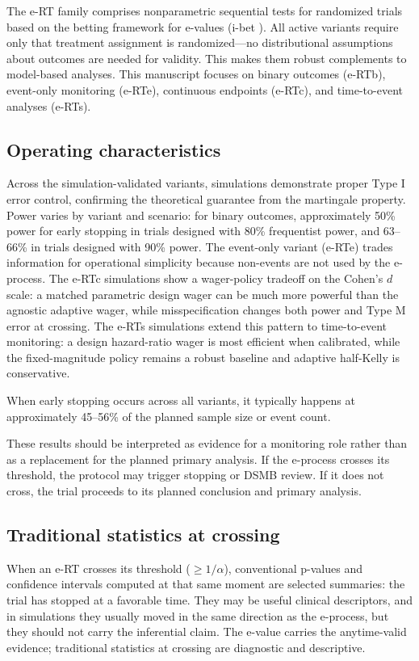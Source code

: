 \documentclass[10pt]{article}
\begin{document}
The e-RT family comprises nonparametric sequential tests for randomized trials based on the betting framework for e-values (i-bet \cite{pmlr-v177-duan22a}). All active variants require only that treatment assignment is randomized---no distributional assumptions about outcomes are needed for validity. This makes them robust complements to model-based analyses. This manuscript focuses on binary outcomes (e-RTb), event-only monitoring (e-RTe), continuous endpoints (e-RTc), and time-to-event analyses (e-RTs).

\subsection{Operating characteristics}

Across the simulation-validated variants, simulations demonstrate proper Type I error control, confirming the theoretical guarantee from the martingale property. Power varies by variant and scenario: for binary outcomes, approximately 50\% power for early stopping in trials designed with 80\% frequentist power, and 63--66\% in trials designed with 90\% power. The event-only variant (e-RTe) trades information for operational simplicity because non-events are not used by the e-process. The e-RTc simulations show a wager-policy tradeoff on the Cohen's $d$ scale: a matched parametric design wager can be much more powerful than the agnostic adaptive wager, while misspecification changes both power and Type M error at crossing. The e-RTs simulations extend this pattern to time-to-event monitoring: a design hazard-ratio wager is most efficient when calibrated, while the fixed-magnitude policy remains a robust baseline and adaptive half-Kelly is conservative.

When early stopping occurs across all variants, it typically happens at approximately 45--56\% of the planned sample size or event count.

These results should be interpreted as evidence for a monitoring role rather than as a replacement for the planned primary analysis. If the e-process crosses its threshold, the protocol may trigger stopping or DSMB review. If it does not cross, the trial proceeds to its planned conclusion and primary analysis.

\subsection{Traditional statistics at crossing}

When an e-RT crosses its threshold ($\geq 1/\alpha$), conventional p-values and confidence intervals computed at that same moment are selected summaries: the trial has stopped at a favorable time. They may be useful clinical descriptors, and in simulations they usually moved in the same direction as the e-process, but they should not carry the inferential claim. The e-value carries the anytime-valid evidence; traditional statistics at crossing are diagnostic and descriptive.
\end{document}
